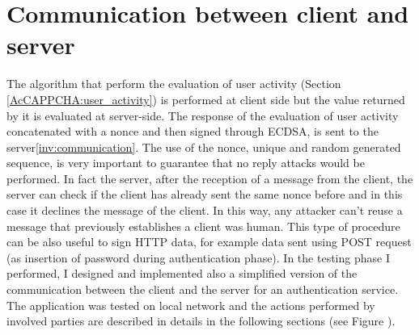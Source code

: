 \section{Communication between client and server}
The algorithm that perform the evaluation of user activity (Section \ref{AcCAPPCHA:user_activity}) is performed at client side but the value returned by it is evaluated at server-side. The response of the evaluation of user activity concatenated with a nonce and then signed through ECDSA, is sent to the server\ref{inv:communication}. The use of the nonce, unique and random generated sequence, is very important to guarantee that no reply attacks would be performed. In fact the server, after the reception of a message from the client, the server can check if the client has already sent the same nonce before and in this case it declines the message of the client. In this way, any attacker can't reuse a message that previously establishes a client was human. This type of procedure can be also useful to sign HTTP data, for example data sent using POST request (as insertion of password during authentication phase). In the testing phase I performed, I designed and implemented also a simplified version of the communication between the client and the server for an authentication service.\\
The application was tested on local network and the actions performed by involved parties are described in details in the following sections (see Figure ).
